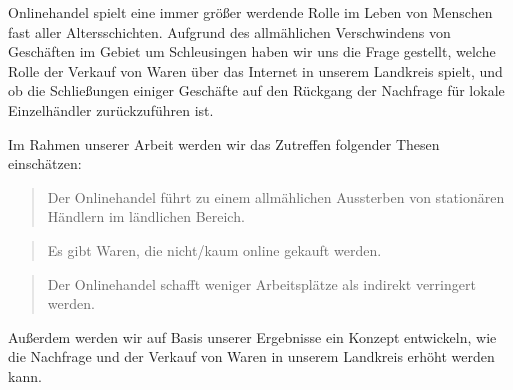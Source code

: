 Onlinehandel spielt eine immer größer werdende Rolle im Leben von Menschen fast aller Altersschichten. Aufgrund des allmählichen Verschwindens von Geschäften im Gebiet um Schleusingen haben wir uns die Frage gestellt, welche Rolle der Verkauf von Waren über das Internet in unserem Landkreis spielt, und ob die Schließungen einiger Geschäfte auf den Rückgang der Nachfrage für lokale Einzelhändler zurückzuführen ist.

Im Rahmen unserer Arbeit werden wir das Zutreffen folgender Thesen einschätzen:
\begin{quote}
     Der Onlinehandel führt zu einem allmählichen Aussterben von stationären Händlern im ländlichen Bereich.
\end{quote}

\begin{quote}
     Es gibt Waren, die nicht/kaum online gekauft werden.
\end{quote}

\begin{quote}
     Der Onlinehandel schafft weniger Arbeitsplätze als indirekt verringert werden.
\end{quote}

Außerdem werden wir auf Basis unserer Ergebnisse ein Konzept entwickeln, wie die Nachfrage und der Verkauf von Waren in unserem Landkreis erhöht werden kann.
